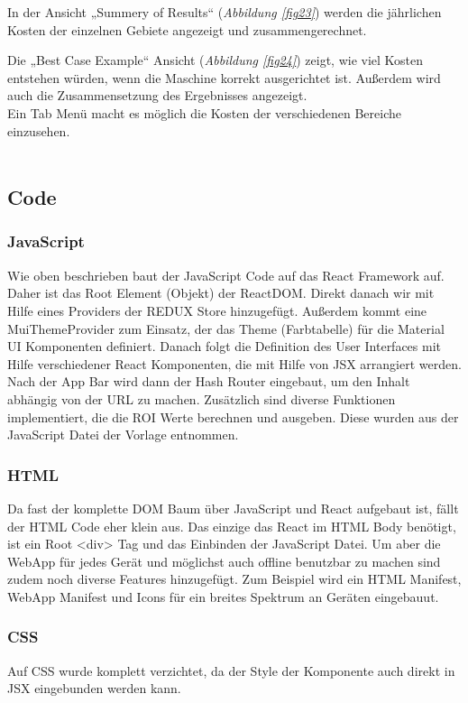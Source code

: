 \documentclass{article}
\begin{document}
			In der Ansicht „Summery of Results“ (\textit{Abbildung \ref{fig23}}) werden die jährlichen Kosten der einzelnen Gebiete angezeigt und zusammengerechnet.

			Die „Best Case Example“ Ansicht (\textit{Abbildung \ref{fig24}}) zeigt, wie viel Kosten entstehen würden, wenn die Maschine korrekt ausgerichtet ist. Außerdem wird auch die Zusammensetzung des Ergebnisses angezeigt.\\
			Ein Tab Menü macht es möglich die Kosten der verschiedenen Bereiche einzusehen.\\\\
			

	\subsection{Code}
		\subsubsection{JavaScript}
			Wie oben beschrieben baut der JavaScript Code auf das React Framework auf. Daher ist das Root Element (Objekt) der ReactDOM. Direkt danach wir mit Hilfe eines Providers der REDUX Store hinzugefügt.
			Außerdem kommt eine MuiThemeProvider zum Einsatz, der das Theme (Farbtabelle) für die Material UI Komponenten definiert.
			Danach folgt die Definition des User Interfaces mit Hilfe verschiedener React Komponenten, die mit Hilfe von JSX arrangiert werden.
			Nach der App Bar wird dann der Hash Router eingebaut, um den Inhalt abhängig von der URL zu machen.
			Zusätzlich sind diverse Funktionen implementiert, die die ROI Werte berechnen und ausgeben. Diese wurden aus der JavaScript Datei der Vorlage entnommen.
		\subsubsection{HTML}
			Da fast der komplette DOM Baum über JavaScript und React aufgebaut ist, fällt der HTML Code eher klein aus. Das einzige das React im HTML Body benötigt, ist ein Root <div> Tag und das Einbinden der JavaScript Datei.
			Um aber die WebApp für jedes Gerät und möglichst auch offline benutzbar zu machen sind zudem noch diverse Features hinzugefügt.
			Zum Beispiel wird ein HTML Manifest, WebApp Manifest und Icons für ein breites Spektrum an Geräten eingebauut.
		\subsubsection{CSS}
			Auf CSS wurde komplett verzichtet, da der Style der Komponente auch direkt in JSX eingebunden werden kann.
		
\end{document}
